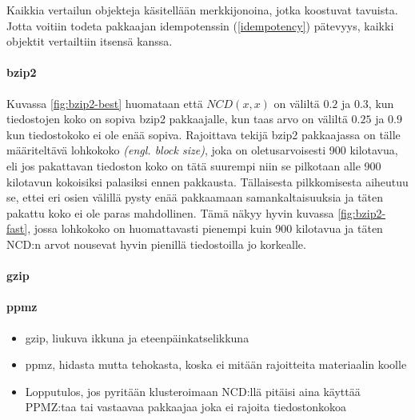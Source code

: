 \documentclass[12pt,finnish]{tktltiki2}
\theoremstyle{definition}
\theoremstyle{remark}
\newcommand{\engl}[1]{\emph{(engl. #1)}}
\begin{document}
      Kaikkia vertailun objekteja käsitellään merkkijonoina, jotka koostuvat tavuista.
      Jotta voitiin todeta pakkaajan idempotenssin (\ref{idempotency}) pätevyys, kaikki objektit vertailtiin itsensä kanssa.

      \paragraph{bzip2} %
      \label{par:bzip2}
        Kuvassa \ref{fig:bzip2-best} huomataan että $NCD(x,x)$ on väliltä $0.2$ ja $0.3$, kun tiedostojen koko on sopiva bzip2 pakkaajalle, kun taas arvo on väliltä $0.25$ ja $0.9$ kun tiedostokoko ei ole enää sopiva.
        Rajoittava tekijä bzip2 pakkaajassa on tälle määriteltävä lohkokoko \engl{block size}, joka on oletusarvoisesti 900 kilotavua, eli jos pakattavan tiedoston koko on tätä suurempi niin se pilkotaan alle 900 kilotavun kokoisiksi palasiksi ennen pakkausta.
        Tällaisesta pilkkomisesta aiheutuu se, ettei eri osien välillä pysty enää pakkaamaan samankaltaisuuksia ja täten pakattu koko ei ole paras mahdollinen.
        Tämä näkyy hyvin kuvassa \ref{fig:bzip2-fast}, jossa lohkokoko on huomattavasti pienempi kuin 900 kilotavua ja täten NCD:n arvot nousevat hyvin pienillä tiedostoilla jo korkealle.

      \paragraph{gzip} %
      \label{par:gzip}


      \paragraph{ppmz} %
      \label{par:ppmz}


    \begin{itemize}
      \item gzip, liukuva ikkuna ja eteenpäinkatselikkuna
      \item ppmz, hidasta mutta tehokasta, koska ei mitään rajoitteita materiaalin koolle
      \item Lopputulos, jos pyritään klusteroimaan NCD:llä pitäisi aina käyttää PPMZ:taa tai vastaavaa pakkaajaa joka ei rajoita tiedostonkokoa
    \end{itemize}
\end{document}
